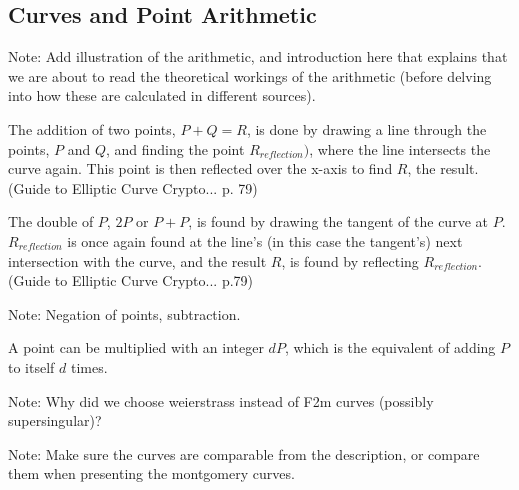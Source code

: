 \subsection{Curves and Point Arithmetic}

Note: Add illustration of the arithmetic, and introduction here that explains that we are about to read
the theoretical workings of the arithmetic (before delving into how these are calculated in different
sources).

The addition of two points, \(P + Q = R\), is done by drawing a line through the points, \(P\) and \(Q\),
and finding the point \(R_{reflection})\), where the line intersects the curve again. This point is
then reflected over the x-axis to find \(R\), the result. (Guide to Elliptic Curve Crypto... p. 79)

The double of \(P\), \(2P\) or \(P+P\), is found by drawing the tangent of the curve at \(P\).
\(R_{reflection}\) is once again found at the line's (in this case the tangent's) next intersection
with the curve, and the result \(R\), is found by reflecting \(R_{reflection}\). (Guide to Elliptic Curve Crypto... p.79)

Note: Negation of points, subtraction.

A point can be multiplied with an integer \(dP\), which is the equivalent of adding \(P\) to itself \(d\) times.

Note: Why did we choose weierstrass instead of F2m curves (possibly supersingular)?

Note: Make sure the curves are comparable from the description, or compare them when presenting
the montgomery curves.


